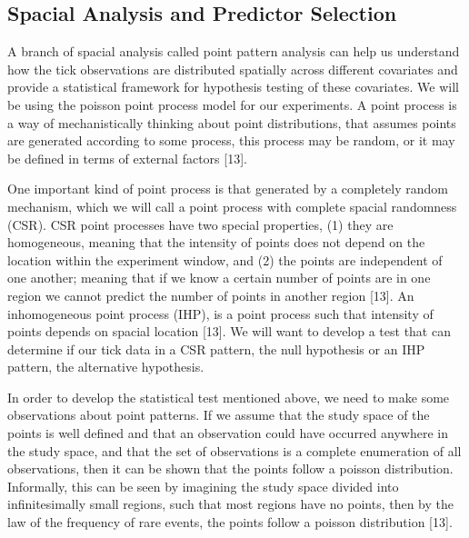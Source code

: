\subsection{Spacial Analysis and Predictor Selection}
\noindent A branch of spacial analysis called point pattern analysis can help us understand how the tick observations are distributed spatially across different covariates and provide a statistical framework for hypothesis testing of these covariates. We will be using the poisson point process model for our experiments. A point process is a way of mechanistically thinking about point distributions, that assumes points are generated according to some process, this process may be random, or it may be defined in terms of external factors [13]. \newline

\noindent One important kind of point process is that generated by a completely random mechanism, which we will call a point process with complete spacial randomness (CSR). CSR point processes have two special properties, (1) they are homogeneous, meaning that the intensity of points does not depend on the location within the experiment window, and (2) the points are independent of one another; meaning that if we know a certain number of points are in one region we cannot predict the number of points in another region [13]. An inhomogeneous point process (IHP), is a point process such that intensity of points depends on spacial location [13]. We will want to develop a test that can determine if our tick data in a CSR pattern, the null hypothesis or an IHP pattern, the alternative hypothesis. \newline 

\noindent In order to develop the statistical test mentioned above, we need to make some observations about point patterns. If we assume that the study space of the points is well defined and that an observation could have occurred anywhere in the study space, and that the set of observations is a complete enumeration of all observations, then it can be shown that the points follow a poisson distribution. Informally, this can be seen by imagining the study space divided into infinitesimally small regions, such that most regions have no points, then by the law of the frequency of rare events, the points follow a poisson distribution [13].  \newline

